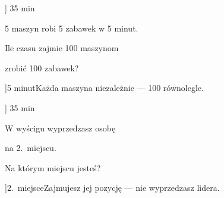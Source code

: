 \ExerciseSlide[\CategoryBadge[LogicColor!20]{Pu\l{}apka}]
  {3}{5 min}{%
    5 maszyn robi 5 zabawek w 5 minut.\par
    Ile czasu zajmie 100 maszynom\par
    zrobi\'c 100 zabawek?
  }
\AnswerSlide[\CategoryBadge[LogicColor!20]{Pu\l{}apka}]{5 minut}{Ka\. zda maszyna niezale\. znie --- 100 r\'{o}wnolegle.}

\ExerciseSlide[\CategoryBadge[LogicColor!20]{Pu\l{}apka}]
  {3}{5 min}{%
    W wy\'scigu wyprzedzasz osob\k{e}\par
    na 2.~miejscu.\par
    Na kt\'{o}rym miejscu jeste\'s?
  }
\AnswerSlide[\CategoryBadge[LogicColor!20]{Pu\l{}apka}]{2.~miejsce}{Zajmujesz jej pozycj\k{e} --- nie wyprzedzasz lidera.}
